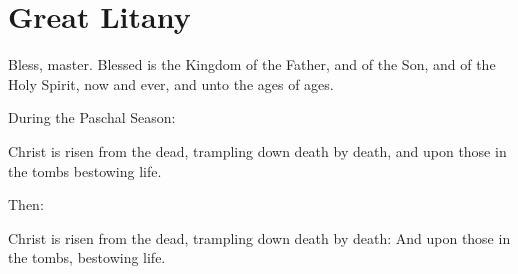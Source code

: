 \section{Great Litany}

\begin{liturgicaltext}
    \deacon Bless, master. 
    \priest Blessed is the Kingdom of the Father, and of the Son, and of the Holy Spirit, now and ever, and unto the ages of ages.
    \choir {}
\end{liturgicaltext}

\begin{rubricsection}
    \begin{rubricmed}
        During the Paschal Season:
    \end{rubricmed}
    \begin{liturgicaltext}
        \clergy Christ is risen from the dead, trampling down death by death, and upon those in the tombs bestowing life. 
    \end{liturgicaltext}
    \begin{rubricmed}
        Then:
    \end{rubricmed}
    \begin{liturgicaltext}
        \clergy Christ is risen from the dead, trampling down death by death:
        \choir And upon those in the tombs, bestowing life.
    \end{liturgicaltext}

\end{rubricsection}

